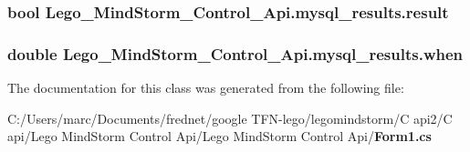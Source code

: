 \subsubsection[{result}]{\setlength{\rightskip}{0pt plus 5cm}bool {\bf Lego\_\-MindStorm\_\-Control\_\-Api.mysql\_\-results.result}}\label{class_lego___mind_storm___control___api_1_1mysql__results_74bbf9491a54cddbca45e4ae9c94b899}


\subsubsection[{when}]{\setlength{\rightskip}{0pt plus 5cm}double {\bf Lego\_\-MindStorm\_\-Control\_\-Api.mysql\_\-results.when}}\label{class_lego___mind_storm___control___api_1_1mysql__results_ac69cb8b3d47f0039bfd58b5aa46f41f}




The documentation for this class was generated from the following file:\begin{CompactItemize}
\item 
C:/Users/marc/Documents/frednet/google TFN-lego/legomindstorm/C api2/C api/Lego MindStorm Control Api/Lego MindStorm Control Api/{\bf Form1.cs}\end{CompactItemize}
